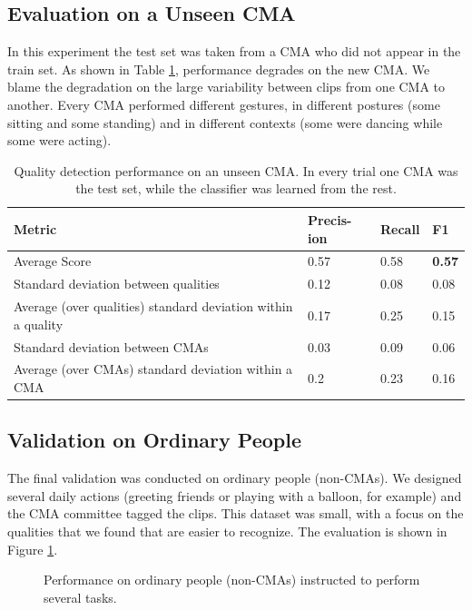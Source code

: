 \documentclass[11pt,twocolumn,varwidth=true,a4paper,fleqn]{article}
\begin{document}
\subsection{Evaluation on a Unseen CMA}
In this experiment the test set was taken from a CMA who did not appear in
the train set. As shown in Table \ref{domainAdaptationBaseLine}, 
performance degrades on the new CMA. We blame the degradation on the large variability between clips from one CMA to another. Every CMA performed different gestures, in different
postures (some sitting and some standing) and in different contexts (some were
dancing while some were acting).

\begin{table}[ht]
  	\centering
	\begin{tabular}{|p{3.2cm}|p{0.9cm}|p{0.9cm}|p{0.7cm}|}
	\hline
	Metric&Precis-ion&Recall&F1\\\hline 
	Average Score&0.57&0.58&\textbf{0.57}\\\hline
	Standard deviation between qualities&0.12&0.08&0.08\\\hline
	Average (over qualities) standard deviation within a
	quality&0.17&0.25&0.15\\\hline
	Standard deviation between CMAs&0.03&0.09&0.06\\\hline
	Average (over CMAs) standard deviation within a CMA&0.2&0.23&0.16\\\hline
	\end{tabular}
	\caption{Quality detection performance on an unseen CMA. In every
	trial one CMA was the test set, while the classifier was learned from the
rest.}
   \label{domainAdaptationBaseLine}
\end{table}

\subsection{Validation on Ordinary People}
The final validation was conducted on ordinary people (non-CMAs). We
designed several daily actions (greeting friends or playing with a balloon, for
example) and the CMA committee tagged the clips. This dataset was small, with a
focus on the qualities that we found that are easier to recognize. The evaluation is shown in Figure \ref{nonCMAs}.

\begin{figure}[ht]
\centering
{}
\caption{Performance on ordinary people (non-CMAs) instructed to
	   perform several tasks.}
\label{nonCMAs}
\end{figure}
\end{document}
